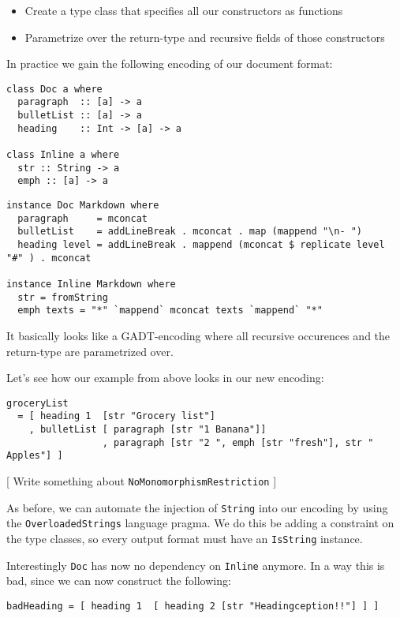 \documentclass[11pt]{article}
\begin{document}
\begin{itemize}
\item Create a type class that specifies all our constructors as functions
\item Parametrize over the return-type and recursive fields of those constructors
\end{itemize}

In practice we gain the following encoding of our document format:

\begin{verbatim}
class Doc a where
  paragraph  :: [a] -> a
  bulletList :: [a] -> a
  heading    :: Int -> [a] -> a

class Inline a where
  str :: String -> a
  emph :: [a] -> a
\end{verbatim}

\begin{verbatim}
instance Doc Markdown where
  paragraph     = mconcat
  bulletList    = addLineBreak . mconcat . map (mappend "\n- ")
  heading level = addLineBreak . mappend (mconcat $ replicate level "#" ) . mconcat

instance Inline Markdown where
  str = fromString
  emph texts = "*" `mappend` mconcat texts `mappend` "*"
\end{verbatim}

It basically looks like a GADT-encoding where all recursive occurences and the
return-type are parametrized over.

Let's see how our example from above looks in our new encoding:

\begin{verbatim}
groceryList
  = [ heading 1  [str "Grocery list"]
    , bulletList [ paragraph [str "1 Banana"]]
                 , paragraph [str "2 ", emph [str "fresh"], str " Apples"] ]
\end{verbatim}

[ Write something about \texttt{NoMonomorphismRestriction} ]

As before, we can automate the injection of \texttt{String} into our encoding by using
the \texttt{OverloadedStrings} language pragma. We do this be adding a constraint on
the type classes, so every output format must have an \texttt{IsString} instance.

Interestingly \texttt{Doc} has now no dependency on \texttt{Inline} anymore. In a way this is
bad, since we can now construct the following:

\begin{verbatim}
badHeading = [ heading 1  [ heading 2 [str "Headingception!!"] ] ]
\end{verbatim}
\end{document}
